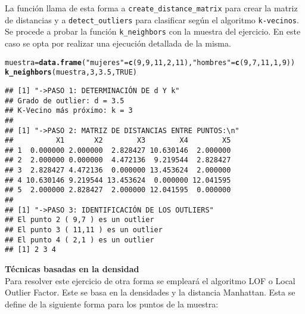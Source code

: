 \documentclass[12pt]{report}\usepackage[]{graphicx}\usepackage[dvipsnames]{xcolor}
\makeatletter
\newcommand{\hlnum}[1]{\textcolor[rgb]{0.686,0.059,0.569}{#1}}%
\newcommand{\hlstr}[1]{\textcolor[rgb]{0.192,0.494,0.8}{#1}}%
\newcommand{\hlstd}[1]{\textcolor[rgb]{0.345,0.345,0.345}{#1}}%
\newcommand{\hlkwb}[1]{\textcolor[rgb]{0.69,0.353,0.396}{#1}}%
\newcommand{\hlkwd}[1]{\textcolor[rgb]{0.737,0.353,0.396}{\textbf{#1}}}%
\newenvironment{kframe}{%
 \def\at@end@of@kframe{}%
 \ifinner\ifhmode%
  \def\at@end@of@kframe{\end{minipage}}%
  \begin{minipage}{\columnwidth}%
 \fi\fi%
 \def\FrameCommand##1{\hskip\@totalleftmargin \hskip-\fboxsep
 \colorbox{shadecolor}{##1}\hskip-\fboxsep
     \hskip-\linewidth \hskip-\@totalleftmargin \hskip\columnwidth}%
 \MakeFramed {\advance\hsize-\width
   \@totalleftmargin\z@ \linewidth\hsize
   \@setminipage}}%
 {\par\unskip\endMakeFramed%
 \at@end@of@kframe}
\newenvironment{knitrout}{}{} %
\makeatother
\begin{document}
					La función llama de esta forma a \texttt{create\_distance\_matrix} para crear la matriz de distancias y a \texttt{detect\_outliers} para clasificar según el algoritmo \texttt{k-vecinos}.\\
					
					Se procede a probar la función \texttt{k\_neighbors} con la muestra del ejercicio. En este caso se opta por realizar una ejecución detallada de la misma.
					
\begin{knitrout}
\color{fgcolor}\begin{kframe}
\begin{alltt}
\hlstd{muestra} \hlkwb{=} \hlkwd{data.frame}\hlstd{(}\hlstr{"mujeres"} \hlstd{=} \hlkwd{c}\hlstd{(}\hlnum{9}\hlstd{,}\hlnum{9}\hlstd{,}\hlnum{11}\hlstd{,}\hlnum{2}\hlstd{,}\hlnum{11}\hlstd{),} \hlstr{"hombres"} \hlstd{=} \hlkwd{c}\hlstd{(}\hlnum{9}\hlstd{,}\hlnum{7}\hlstd{,}\hlnum{11}\hlstd{,}\hlnum{1}\hlstd{,}\hlnum{9}\hlstd{))}
\hlkwd{k_neighbors}\hlstd{(muestra,}\hlnum{3}\hlstd{,}\hlnum{3.5}\hlstd{,}\hlnum{TRUE}\hlstd{)}
\end{alltt}
\begin{verbatim}
## [1] "->PASO 1: DETERMINACIÓN DE d Y k"
## Grado de outlier: d = 3.5 
## K-Vecino más próximo: k = 3 
## 
## [1] "->PASO 2: MATRIZ DE DISTANCIAS ENTRE PUNTOS:\n"
##          X1       X2        X3        X4        X5
## 1  0.000000 2.000000  2.828427 10.630146  2.000000
## 2  2.000000 0.000000  4.472136  9.219544  2.828427
## 3  2.828427 4.472136  0.000000 13.453624  2.000000
## 4 10.630146 9.219544 13.453624  0.000000 12.041595
## 5  2.000000 2.828427  2.000000 12.041595  0.000000
## 
## [1] "->PASO 3: IDENTIFICACIÓN DE LOS OUTLIERS"
## El punto 2 ( 9,7 ) es un outlier
## El punto 3 ( 11,11 ) es un outlier
## El punto 4 ( 2,1 ) es un outlier
## [1] 2 3 4
\end{verbatim}
\end{kframe}
\end{knitrout}
					
					\textbf{Técnicas basadas en la densidad}\\
					
					Para resolver este ejercicio de otra forma se empleará el algoritmo LOF o Local Outlier Factor. Este se basa en la densidades y la distancia Manhattan. Esta se define de la siguiente forma para los puntos de la muestra: 
					
\end{document}
